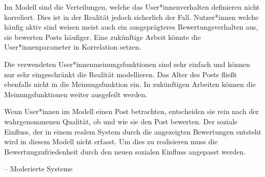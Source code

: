 Im Modell sind die Verteilungen, welche das User*innenverhalten definieren nicht korreliert. Dies ist in der Realität jedoch sicherlich der Fall. Nutzer*innen welche häufig aktiv sind weisen meist auch ein ausgeprägteres Bewertungsverhalten aus, sie bewerten Posts häufiger. Eine zukünftige Arbeit könnte die User*innenparameter in Korrelation setzen.

Die verwendeten User*innenmeinungsfunktionen sind sehr einfach und können nur sehr eingeschränkt die Realität modellieren. Das Alter des Posts fließt ebenfalls nicht in die Meinungsfunktion ein. In zukünftigen Arbeiten können die Meinungsfunktionen weiter ausgefeilt werden.

Wenn User*innen im Modell einen Post betrachten, entscheiden sie rein nach der wahrgenommenen Qualität, ob und wie sie den Post bewerten. Der soziale Einfluss, der in einem realem System durch die angezeigten Bewertungen entsteht wird in diesem Modell nicht erfasst. Um dies zu realisieren muss die Bewertungzufriedenheit durch den neuen sozialen Einfluss angepasst werden.


--  Moderierte Systeme